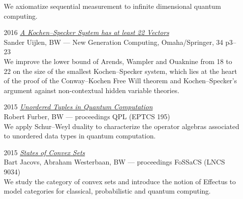 \documentclass{article}
\newcommand\partitle[1]{\vskip20pt\par\noindent{\textsf{\textbf{#1}}}}
\begin{document}
\begin{itemize}
    We axiomatize sequential measurement to infinite dimensional quantum
    computing.
\item[2016] \emph{\href{https://link.springer.com/article/10.1007/s00354-016-0202-5}{A Kochen--Specker System has at least 22 Vectors}}\\
    {\footnotesize Sander Uijlen, BW ---  New Generation Computing, Omaha/Springer, 34 p3--23}\\
    We improve the lower bound of Arends, Wampler and Ouaknine from 18 to 22
    on the size of the smallest Kochen--Specker system, which lies
    at the heart of the proof of the Conway--Kochen Free Will
    theorem and Kochen--Specker's argument against non-contextual
    hidden variable theories.
\item[2015] \emph{\href{http://eptcs.web.cse.unsw.edu.au/paper.cgi?QPL2015.15}{Unordered Tuples in Quantum Computation}}\\
    {\footnotesize Robert Furber, BW --- proceedings QPL (EPTCS 195)}\\
        We apply Schur--Weyl duality to characterize the operator algebras
        associated to unordered data types in quantum computation.
    \item[2015] \emph{\href{https://link.springer.com/chapter/10.1007/978-3-662-46678-0_6}{States of Convex Sets}}\\
    {\footnotesize Bart Jacovs, Abraham Westerbaan, BW ---
        proceedings FoSSaCS (LNCS 9034)}\\
    We study the category of convex sets and introduce the notion of Effectus
        to model categories for classical, probabilistic and
        quantum computing.
\end{itemize}

\end{document}
